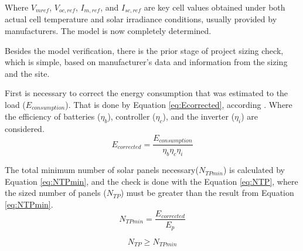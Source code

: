 \documentclass[journal]{IEEEtran}
\begin{document}
Where $ V_{mref} $, $ V_{oc,ref} $, $ I_{m,ref} $, and $ I_{sc,ref} $ are key cell values obtained under both actual cell temperature and solar irradiance conditions, usually provided by manufacturers. The model is now completely determined.
%
%
%
%
%
%

Besides the model verification, there is the prior stage of project sizing check, which is simple, based on manufacturer's data and information from the sizing and the site. 

First is necessary to correct the energy consumption that was estimated to the load ($E_{consumption}$). That is done by Equation \ref{eq:Ecorrected}, according \cite{Pinho}. Where the efficiency of batteries ($\eta_{b}$), controller ($\eta_{c}$), and the inverter ($\eta_{i}$) are considered.
\begin{equation}
\label{eq:Ecorrected}
E_{corrected} = \dfrac{E_{consumption}}{ \eta_{b} \eta_{c} \eta_{i} }
\end{equation}

The total minimum number of solar panels necessary($ N_{TPmin} $) is calculated by Equation \ref{eq:NTPmin}, and the check is done with the Equation \ref{eq:NTP}, where the sized number of panels ($ N_{TP} $) must be greater than the result from Equation \ref{eq:NTPmin}.
\begin{equation}
\label{eq:NTPmin}
N_{TPmin} = \dfrac{E_{corrected}}{E_{p}}
\end{equation}

\begin{equation}
\label{eq:NTP}
N_{TP} \geq N_{TPmin}
\end{equation}
\end{document}
